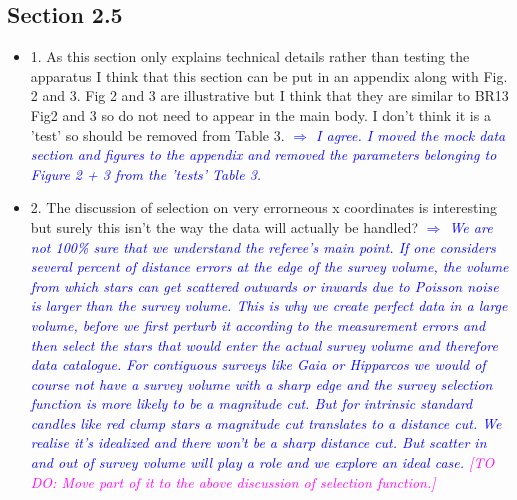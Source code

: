 \documentclass[10pt,a4paper]{article}
\newcommand{\Wilma}[1]{\textcolor{Magenta}{#1}}
\newcommand{\Comment}[1]{\textsl{\textcolor{Blue}{$\Longrightarrow$ {#1}}}}
\begin{document}
\subsection{Section 2.5}
\begin{itemize}
\item 1. As this section only explains technical details rather than testing the apparatus I think that this section can be put in an appendix along with Fig. 2 and 3. Fig 2 and 3 are illustrative but I think that they are similar to BR13 Fig2 and 3 so do not need to appear in the main body. I don't think it is a 'test' so should be removed from Table 3. \Comment{I agree. I moved the mock data section and figures to the appendix and removed the parameters belonging to Figure 2 + 3 from the 'tests' Table 3.}
\item 2. The discussion of selection on very errorneous x coordinates is interesting but surely this isn't the way the data will actually be handled?
\Comment{We are not 100\% sure that we understand the referee's main point. If one considers several percent of distance errors at the edge of the survey volume, the volume from which stars can get scattered outwards or inwards due to Poisson noise is larger than the survey volume. This is why we create perfect data in a large volume, before we first perturb it according to the measurement errors and then select the stars that would enter the actual survey volume and therefore data catalogue. For contiguous surveys like Gaia or Hipparcos we would of course not have a survey volume with a sharp edge and the survey selection function is more likely to be a magnitude cut. But for intrinsic standard candles like red clump stars a magnitude cut translates to a distance cut. We realise it's idealized and there won't be a sharp distance cut. But scatter in and out of survey volume will play a role and we explore an ideal case. \Wilma{[TO DO: Move part of it to the above discussion of selection function.]}}
\end{itemize}
\end{document}
